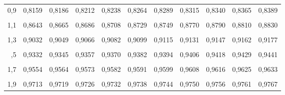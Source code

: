 \documentclass[
  ngerman,
]{article}
\begin{document}
\begin{table}[!h]
{\begin{tabular}{>{}r|rrrrrrrrrr}
0,9 & 0,8159 & 0,8186 & 0,8212 & 0,8238 & 0,8264 & 0,8289 & 0,8315 & 0,8340 & 0,8365 & 0,8389\\
\addlinespace
\cellcolor{gray!6}{1,0} & \cellcolor{gray!6}{0,8413} & \cellcolor{gray!6}{0,8438} & \cellcolor{gray!6}{0,8461} & \cellcolor{gray!6}{0,8485} & \cellcolor{gray!6}{0,8508} & \cellcolor{gray!6}{0,8531} & \cellcolor{gray!6}{0,8554} & \cellcolor{gray!6}{0,8577} & \cellcolor{gray!6}{0,8599} & \cellcolor{gray!6}{0,8621}\\
1,1 & 0,8643 & 0,8665 & 0,8686 & 0,8708 & 0,8729 & 0,8749 & 0,8770 & 0,8790 & 0,8810 & 0,8830\\
\cellcolor{gray!6}{1,2} & \cellcolor{gray!6}{0,8849} & \cellcolor{gray!6}{0,8869} & \cellcolor{gray!6}{0,8888} & \cellcolor{gray!6}{0,8907} & \cellcolor{gray!6}{0,8925} & \cellcolor{gray!6}{0,8944} & \cellcolor{gray!6}{0,8962} & \cellcolor{gray!6}{0,8980} & \cellcolor{gray!6}{0,8997} & \cellcolor{gray!6}{0,9015}\\
1,3 & 0,9032 & 0,9049 & 0,9066 & 0,9082 & 0,9099 & 0,9115 & 0,9131 & 0,9147 & 0,9162 & 0,9177\\
\cellcolor{gray!6}{1,4} & \cellcolor{gray!6}{0,9192} & \cellcolor{gray!6}{0,9207} & \cellcolor{gray!6}{0,9222} & \cellcolor{gray!6}{0,9236} & \cellcolor{gray!6}{0,9251} & \cellcolor{gray!6}{0,9265} & \cellcolor{gray!6}{0,9279} & \cellcolor{gray!6}{0,9292} & \cellcolor{gray!6}{0,9306} & \cellcolor{gray!6}{0,9319}\\
\addlinespace
1,5 & 0,9332 & 0,9345 & 0,9357 & 0,9370 & 0,9382 & 0,9394 & 0,9406 & 0,9418 & 0,9429 & 0,9441\\
\cellcolor{gray!6}{1,6} & \cellcolor{gray!6}{0,9452} & \cellcolor{gray!6}{0,9463} & \cellcolor{gray!6}{0,9474} & \cellcolor{gray!6}{0,9484} & \cellcolor{gray!6}{0,9495} & \cellcolor{gray!6}{0,9505} & \cellcolor{gray!6}{0,9515} & \cellcolor{gray!6}{0,9525} & \cellcolor{gray!6}{0,9535} & \cellcolor{gray!6}{0,9545}\\
1,7 & 0,9554 & 0,9564 & 0,9573 & 0,9582 & 0,9591 & 0,9599 & 0,9608 & 0,9616 & 0,9625 & 0,9633\\
\cellcolor{gray!6}{1,8} & \cellcolor{gray!6}{0,9641} & \cellcolor{gray!6}{0,9649} & \cellcolor{gray!6}{0,9656} & \cellcolor{gray!6}{0,9664} & \cellcolor{gray!6}{0,9671} & \cellcolor{gray!6}{0,9678} & \cellcolor{gray!6}{0,9686} & \cellcolor{gray!6}{0,9693} & \cellcolor{gray!6}{0,9699} & \cellcolor{gray!6}{0,9706}\\
1,9 & 0,9713 & 0,9719 & 0,9726 & 0,9732 & 0,9738 & 0,9744 & 0,9750 & 0,9756 & 0,9761 & 0,9767\\

\end{tabular}}
\end{table}
\end{document}

